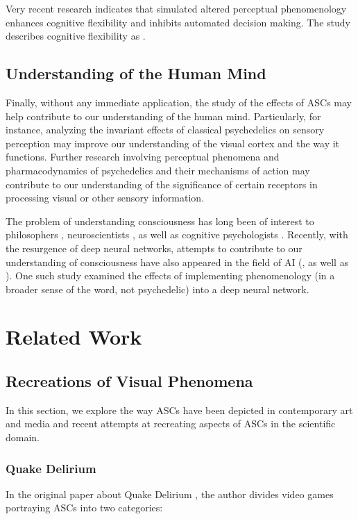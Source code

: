 Very recent research \autocite{rastelli2021simulated} indicates that simulated altered perceptual phenomenology enhances cognitive flexibility and inhibits automated decision making. The study describes cognitive flexibility as .

\subsection{Understanding of the Human Mind}
Finally, without any immediate application, the study of the effects of \acp{ASC} may help contribute to our understanding of the human mind. Particularly, for instance, analyzing the invariant effects of classical psychedelics on sensory perception may improve our understanding of the visual cortex and the way it functions.
Further research involving perceptual phenomena and pharmacodynamics of psychedelics and their mechanisms of action may contribute to our understanding of the significance of certain receptors in processing visual or other sensory information.

The problem of understanding consciousness has long been of interest to philosophers \autocite{block1993consciousness}, neuroscientists \autocite{crick1990towards}, as well as cognitive psychologists \autocite{dehaene2014consciousness}. Recently, with the resurgence of deep neural networks, attempts to contribute to our understanding of consciousness have also appeared in the field of \ac{AI} (\textcite{bengio2017consciousness}, as well as \textcite{reggia2020artificial}). One such study \autocite{bensemann2021effects} examined the effects of implementing phenomenology (in a broader sense of the word, not psychedelic) into a deep neural network.

\section{Related Work}

\subsection{Recreations of Visual Phenomena}
In this section, we explore the way \acp{ASC} have been depicted in contemporary art and media and recent attempts at recreating aspects of \acp{ASC} in the scientific domain.

\subsubsection{Quake Delirium}
In the original paper about Quake Delirium \autocite{weinel2011quake}, the author divides video games portraying \acp{ASC} into two categories:

